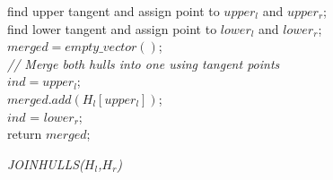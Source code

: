 \documentclass{article}
\begin{document}
\begin{algorithm}[H]
\SetAlgoLined
{}
find upper tangent and assign point to $upper_l$ and $upper_r$;\\
find lower tangent and assign point to $lower_l$ and $lower_r$;\\
$merged = empty\_vector()$;\\
\textit{// Merge both hulls into one using tangent points}\\
$ind = upper_l$; \\
$merged.add(H_l[upper_l])$; \\
$ind$ = $lower_r$;\\
return $merged$;
\caption{\textit{JOINHULLS($H_l$,$H_r$)}}
\end{algorithm}
\end{document}
